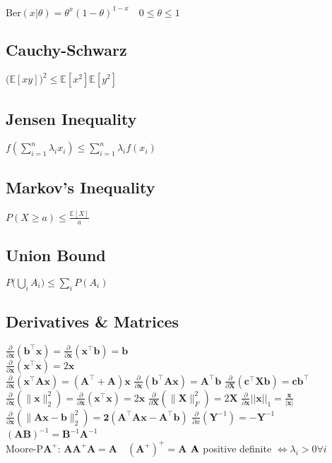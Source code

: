 $\text{Ber}(x|\theta) = \theta^x(1-\theta)^{1-x} \quad 0 \leq \theta \leq 1$
\subsection*{Cauchy-Schwarz}
$\big(\mathbb{E}[xy]\big)^2 \leqslant \mathbb{E}[x^2]\mathbb{E}[y^2]$
\subsection*{Jensen Inequality}
$f(\sum_{i=1}^n \lambda_i x_i) \leq \sum_{i=1}^n \lambda_i f(x_i)$
\subsection*{Markov's Inequality}
$P(X \geq a) \leq \frac{\mathbb{E}[X]}a$
\subsection*{Union Bound}
$P\big(\bigcup_i A_i\big) \leq \sum_iP(A_i)$

\subsection*{Derivatives \& Matrices}
$\frac{\partial}{\partial \mathbf{x}}(\mathbf{b}^\top \mathbf{x}) = \frac{\partial}{\partial \mathbf{x}}(\mathbf{x}^\top \mathbf{b}) = \mathbf{b}$ \\
$\frac{\partial}{\partial \mathbf{x}}(\mathbf{x}^\top \mathbf{x}) = 2\mathbf{x}$ \\
$\frac{\partial}{\partial \mathbf{x}}(\mathbf{x}^\top \mathbf{A}\mathbf{x}) = (\mathbf{A}^\top + \mathbf{A})\mathbf{x}$ \quad
$\frac{\partial}{\partial \mathbf{x}}(\mathbf{b}^\top \mathbf{A}\mathbf{x}) = \mathbf{A}^\top \mathbf{b}$ \quad
$\frac{\partial}{\partial \mathbf{X}}(\mathbf{c}^\top \mathbf{X} \mathbf{b}) = \mathbf{c}\mathbf{b}^\top$ \quad \\
$\frac{\partial}{\partial \mathbf{x}}(\|\mathbf{x}\|^2_2) = \frac{\partial}{\partial \mathbf{x}} (\mathbf{x}^\top \mathbf{x}) = 2\mathbf{x}$ \quad
$\frac{\partial}{\partial \mathbf{X}}(\|\mathbf{X}\|_F^2) = 2\mathbf{X}$  \quad \quad
$\frac{\partial}{\partial \mathbf{x}}||\mathbf{x}||_1 = \frac{\mathbf{x}}{|\mathbf{x}|}$ \\
$\frac{\partial}{\partial \mathbf{x}}(\|\mathbf{Ax - b}\|_2^2) = \mathbf{2(A^\top Ax-A^\top b)}$ \quad
$\frac{\partial}{\partial x}(\mathbf{Y}^{-1}) = -\mathbf{Y}^{-1}$ \\
$(\mathbf{AB})^{-1} = \mathbf{B}^{-1}\mathbf{A}^{-1}$ \\
Moore-P$\mathbf{A^+}$: $\mathbf{AA^+A} = \mathbf{A}\quad (\mathbf{A^+})^+=\mathbf{A}$
$\mathbf{A}\space $ positive definite $\iff \lambda_i>0\forall i$


